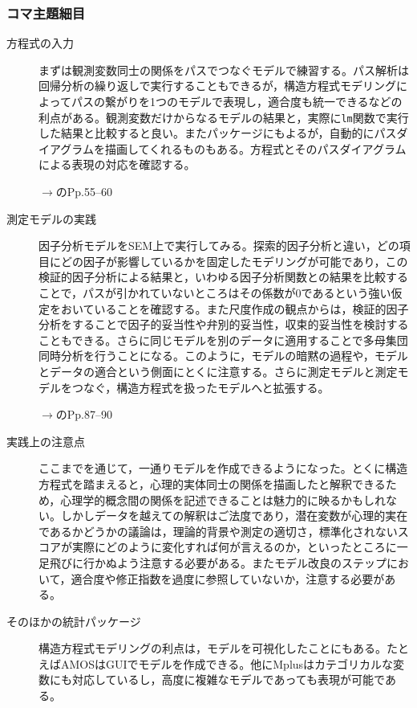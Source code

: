 \subsubsection{コマ主題細目}
\begin{description}
	\item[方程式の入力] まずは観測変数同士の関係をパスでつなぐモデルで練習する。パス解析は回帰分析の繰り返しで実行することもできるが，構造方程式モデリングによってパスの繋がりを1つのモデルで表現し，適合度も統一できるなどの利点がある。観測変数だけからなるモデルの結果と，実際に\texttt{lm}関数で実行した結果と比較すると良い。またパッケージにもよるが，自動的にパスダイアグラムを描画してくれるものもある。方程式とそのパスダイアグラムによる表現の対応を確認する。

	      \begin{flushright}
		      $\to$\citet{Kosugi2014Mplus}のPp.55--60
	      \end{flushright}

	\item[測定モデルの実践] 因子分析モデルをSEM上で実行してみる。探索的因子分析と違い，どの項目にどの因子が影響しているかを固定したモデリングが可能であり，この検証的因子分析による結果と，いわゆる因子分析関数との結果を比較することで，パスが引かれていないところはその係数が$0$であるという強い仮定をおいていることを確認する。また尺度作成の観点からは，検証的因子分析をすることで因子的妥当性や弁別的妥当性，収束的妥当性を検討することもできる。さらに同じモデルを別のデータに適用することで多母集団同時分析を行うことになる。このように，モデルの暗黙の過程や，モデルとデータの適合という側面にとくに注意する。さらに測定モデルと測定モデルをつなぐ，構造方程式を扱ったモデルへと拡張する。

	      \begin{flushright}
		      $\to$\citet{Kosugi2014Mplus}のPp.87--90
	      \end{flushright}

	\item[実践上の注意点] ここまでを通じて，一通りモデルを作成できるようになった。とくに構造方程式を踏まえると，心理的実体同士の関係を描画したと解釈できるため，心理学的概念間の関係を記述できることは魅力的に映るかもしれない。しかしデータを越えての解釈はご法度であり，潜在変数が心理的実在であるかどうかの議論は，理論的背景や測定の適切さ，標準化されないスコアが実際にどのように変化すれば何が言えるのか，といったところに一足飛びに行かぬよう注意する必要がある。またモデル改良のステップにおいて，適合度や修正指数を過度に参照していないか，注意する必要がある。

	\item[そのほかの統計パッケージ] 構造方程式モデリングの利点は，モデルを可視化したことにもある。たとえばAMOSはGUIでモデルを作成できる。他にMplusはカテゴリカルな変数にも対応しているし，高度に複雑なモデルであっても表現が可能である。
\end{description}
